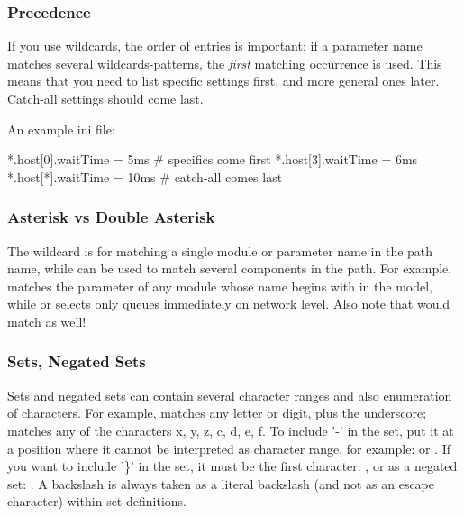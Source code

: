 \subsubsection{Precedence}

If you use wildcards, the order of entries is important: if a parameter
name matches several wildcards-patterns, the \textit{first} matching occurrence
is used. This means that you need to list specific settings first, and
more general ones later. Catch-all settings should come last.

An example ini file:

\begin{inifile}
[General]
*.host[0].waitTime = 5ms   # specifics come first
*.host[3].waitTime = 6ms
*.host[*].waitTime = 10ms  # catch-all comes last
\end{inifile}


\subsubsection{Asterisk vs Double Asterisk}

The \ttt{*} wildcard is for matching a single module or parameter name in the
path name, while \ttt{**} can be used to match several components in the path.
For example,  matches the  parameter of any module
whose name begins with  in the model, while 
or  selects only queues immediately on network level.
Also note that  would match 
as well!

\subsubsection{Sets, Negated Sets}

Sets and negated sets can contain several character ranges and also
enumeration of characters. For example,  matches any letter
or digit, plus the underscore;  matches any of the characters
x, y, z, c, d, e, f.
To include '-' in the set, put it at a position where it cannot be
interpreted as character range, for example:  or .
If you want to include '\}' in the set, it must be the first
character: , or as a negated set: .
A backslash is always taken as a literal backslash (and not as an escape character)
within set definitions.


